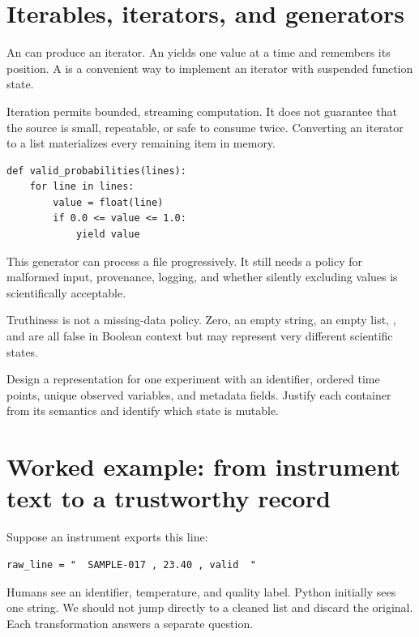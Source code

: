 \section{Iterables, iterators, and generators}

An  can produce an iterator. An  yields one value
at a time and remembers its position. A  is a convenient way to
implement an iterator with suspended function state.

Iteration permits bounded, streaming computation. It does not guarantee that
the source is small, repeatable, or safe to consume twice. Converting an
iterator to a list materializes every remaining item in memory.

\begin{lstlisting}
def valid_probabilities(lines):
    for line in lines:
        value = float(line)
        if 0.0 <= value <= 1.0:
            yield value
\end{lstlisting}

This generator can process a file progressively. It still needs a policy for
malformed input, provenance, logging, and whether silently excluding values is
scientifically acceptable.

\begin{warningbox}
Truthiness is not a missing-data policy. Zero, an empty string, an empty list,
, and  are all false in Boolean context but may represent
very different scientific states.
\end{warningbox}

\begin{checkpointbox}
Design a representation for one experiment with an identifier, ordered time
points, unique observed variables, and metadata fields. Justify each container
from its semantics and identify which state is mutable.
\end{checkpointbox}

\section{Worked example: from instrument text to a trustworthy record}

Suppose an instrument exports this line:

\begin{lstlisting}
raw_line = "  SAMPLE-017 , 23.40 , valid  "
\end{lstlisting}

Humans see an identifier, temperature, and quality label. Python initially sees
one string. We should not jump directly to a cleaned list and discard the
original. Each transformation answers a separate question.

